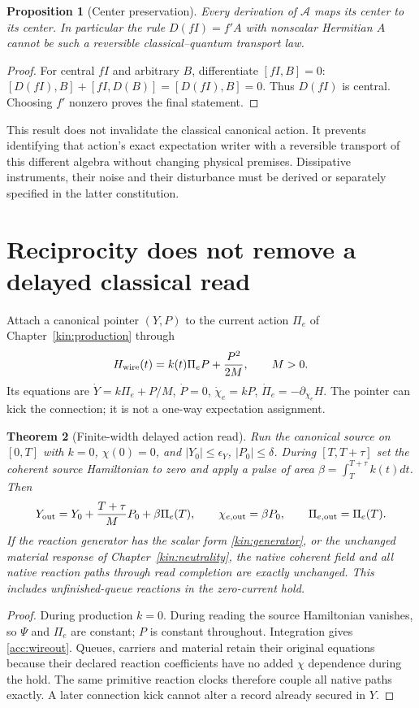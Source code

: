 \documentclass[11pt,oneside,openany]{book}
\newtheorem{theorem}{Theorem}[chapter]
\newtheorem{proposition}[theorem]{Proposition}
\theoremstyle{definition}
\theoremstyle{remark}\newtheorem{remark}[theorem]{Remark}
\begin{document}
\begin{proposition}[Center preservation]\label{acc:center}
Every derivation of $\mathcal A$ maps its center to its center. In
particular the rule $D(fI)=f'A$ with nonscalar Hermitian $A$ cannot be such
a reversible classical--quantum transport law.
\end{proposition}
\begin{proof}
For central $fI$ and arbitrary $B$, differentiate $[fI,B]=0$:
$[D(fI),B]+[fI,D(B)]=[D(fI),B]=0$.
Thus $D(fI)$ is central. Choosing $f'$ nonzero proves the final statement.
\end{proof}
This result does not invalidate the classical canonical action. It prevents
identifying that action's exact expectation writer with a reversible
transport of this different algebra without changing physical premises.
Dissipative instruments, their noise and their disturbance must be derived
or separately specified in the latter constitution.

\section{Reciprocity does not remove a delayed classical read}
Attach a canonical pointer $(Y,P)$ to the current action $\Pi_e$ of
Chapter~\ref{kin:production} through
\begin{equation}
 H_{\rm wire}(t)=k(t)\Pi_eP+\frac{P^2}{2M},\qquad M>0.
 \label{acc:wire}
\end{equation}
Its equations are
$\dot Y=k\Pi_e+P/M$, $\dot P=0$, $\dot\chi_e=kP$,
$\dot\Pi_e=-\partial_{\chi_e}H$.
The pointer can kick the connection; it is not a one-way expectation
assignment.

\begin{theorem}[Finite-width delayed action read]\label{acc:delayed}
Run the canonical source on $[0,T]$ with $k=0$, $\chi(0)=0$, and
$|Y_0|\le\epsilon_Y$, $|P_0|\le\delta$. During $[T,T+\tau]$ set the
coherent source Hamiltonian to zero and apply a pulse of area
$\beta=\int_T^{T+\tau}k(t)dt$. Then
\begin{equation}
 Y_{
\rm out}=Y_0+\frac{T+\tau}{M}P_0+\beta\Pi_e(T),\qquad
 \chi_{e,\rm out}=\beta P_0,\qquad \Pi_{e,\rm out}=\Pi_e(T).
 \label{acc:wireout}
\end{equation}
If the reaction generator has the scalar form \eqref{kin:generator}, or
the unchanged material response of Chapter~\ref{kin:neutrality}, the
native coherent field and all native reaction paths through read completion
are exactly unchanged. This includes unfinished-queue reactions in the
zero-current hold.
\end{theorem}
\begin{proof}
During production $k=0$. During reading the source Hamiltonian vanishes,
so $\Psi$ and $\Pi_e$ are constant; $P$ is constant throughout.
Integration gives \eqref{acc:wireout}. Queues, carriers and material retain
their original equations because their declared reaction coefficients
have no added $\chi$ dependence during the hold. The same primitive
reaction clocks therefore couple all native paths exactly. A later
connection kick cannot alter a record already secured in $Y$.
\end{proof}
\end{document}
